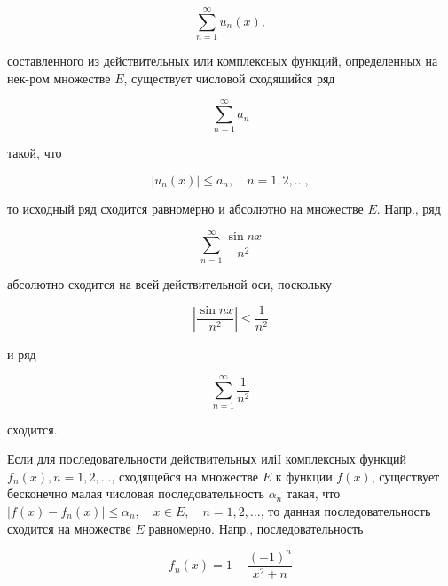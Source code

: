 \documentclass[10pt]{article}
\begin{document}
\[

\sum_{n=1}^{\infty} u_{n}(x),

\]



составленного из действительных или комплексных функций, определенных на нек-ром множестве $E$, существует числовой сходящийся ряд



\[

\sum_{n=1}^{\infty} a_{n}

\]



такой, что



\[

\left|u_{n}(x)\right| \leqslant a_{n}, \quad n=1,2, \ldots,

\]



то исходный ряд сходится равномерно и абсолютно на множестве $E$. Напр., ряд



\[

\sum_{n=1}^{\infty} \frac{\sin n x}{n^{2}}

\]



абсолютно сходится на всей действительной оси, поскольку



\[

\left|\frac{\sin n x}{n^{2}}\right| \leqslant \frac{1}{n^{2}}

\]



и ряд



\[

\sum_{n=1}^{\infty} \frac{1}{n^{2}}

\]



сходится.



Если для последовательности действительных иліІ комплексных функций $f_{n}(x), n=1,2, \ldots$, сходящейся на множестве $E$ к функции $f(x)$, существует бесконечно малая числовая последовательность $\alpha_{n}$ такая, что $\left|f(x)-f_{n}(x)\right| \leqslant \alpha_{n}, \quad x \in E, \quad n=1,2, \ldots$, то данная последовательность сходится на множестве $E$ равномерно. Напр., последовательность



\[

f_{n}(x)=1-\frac{(-1)^{n}}{x^{2}+n}

\]
\end{document}
